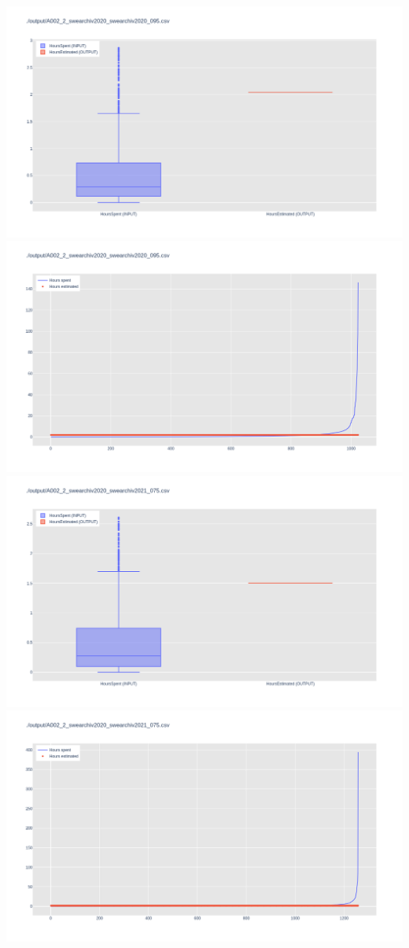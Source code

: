 \includegraphics[width=\textwidth]{Scripts/output/A002_2_swearchiv2020_swearchiv2020_095.csv.png}
\includegraphics[width=\textwidth]{Scripts/output/A002_2_swearchiv2020_swearchiv2020_095.csv.scatter.png}
\includegraphics[width=\textwidth]{Scripts/output/A002_2_swearchiv2020_swearchiv2021_075.csv.png}
\includegraphics[width=\textwidth]{Scripts/output/A002_2_swearchiv2020_swearchiv2021_075.csv.scatter.png}

